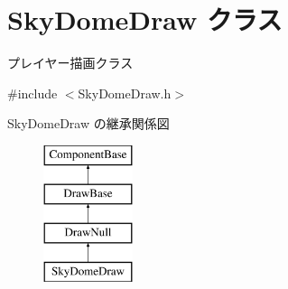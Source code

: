 \hypertarget{class_sky_dome_draw}{}\section{Sky\+Dome\+Draw クラス}
\label{class_sky_dome_draw}


プレイヤー描画クラス  




{\ttfamily \#include $<$Sky\+Dome\+Draw.\+h$>$}

Sky\+Dome\+Draw の継承関係図\begin{figure}[H]
\begin{center}
\leavevmode
\includegraphics[height=4.000000cm]{class_sky_dome_draw}
\end{center}
\end{figure}
